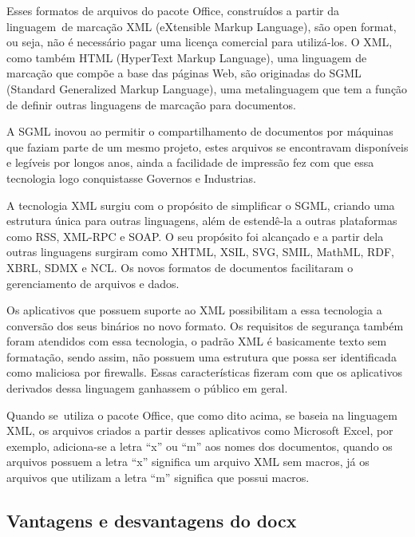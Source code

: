 \bigskip

{
Esses formatos de arquivos do pacote Office, constru\'idos a partir da linguagem\ de marca\c{c}\~ao XML (eXtensible
Markup Language), s\~ao open format, ou seja, n\~ao \'e necess\'ario pagar uma licen\c{c}a comercial para
utiliz\'a-los. O XML, como tamb\'em HTML (HyperText Markup Language), uma linguagem de marca\c{c}\~ao que comp\~oe a
base das p\'aginas Web, s\~ao originadas do SGML (Standard Generalized Markup Language), uma metalinguagem que tem a
fun\c{c}\~ao de definir outras linguagens de marca\c{c}\~ao para documentos.}

{
A SGML inovou ao permitir o compartilhamento de documentos por m\'aquinas que faziam parte de um mesmo projeto, estes
arquivos se encontravam dispon\'iveis e leg\'iveis por longos anos, ainda a facilidade de impress\~ao fez com que essa
tecnologia logo conquistasse Governos e Industrias.}

{
A tecnologia XML surgiu com o prop\'osito de simplificar o SGML, criando uma estrutura \'unica para outras linguagens,
al\'em de estend\^e-la a outras plataformas como RSS, XML-RPC e SOAP. O seu prop\'osito foi alcan\c{c}ado e a partir
dela outras linguagens surgiram como XHTML, XSIL, SVG, SMIL, MathML, RDF, XBRL, SDMX e NCL. Os novos formatos de
documentos facilitaram o gerenciamento de arquivos e dados.}

{
Os aplicativos que possuem suporte ao XML possibilitam a essa tecnologia a convers\~ao dos seus bin\'arios no novo
formato. Os requisitos de seguran\c{c}a tamb\'em foram atendidos com essa tecnologia, o padr\~ao XML \'e basicamente
texto sem formata\c{c}\~ao, sendo assim, n\~ao possuem uma estrutura que possa ser identificada como maliciosa por
firewalls. Essas caracter\'isticas fizeram com que os aplicativos derivados dessa linguagem ganhassem o p\'ublico em
geral.}

{
Quando se\ utiliza o pacote Office, que como dito acima, se baseia na linguagem XML, os arquivos criados a partir desses
aplicativos como Microsoft Excel, por exemplo, adiciona-se a letra ``x'' ou ``m'' aos nomes dos documentos, quando os
arquivos possuem a letra ``x'' significa um arquivo XML sem macros, j\'a os arquivos que utilizam a letra ``m''
significa que possui macros.}


\bigskip

\subsection[Vantagens e desvantagens do docx]{ Vantagens e desvantagens do docx}

